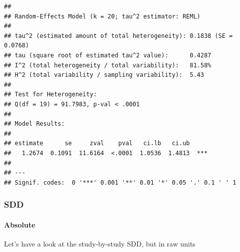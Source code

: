 \documentclass[
]{article}
\begin{document}
\begin{verbatim}
## 
## Random-Effects Model (k = 20; tau^2 estimator: REML)
## 
## tau^2 (estimated amount of total heterogeneity): 0.1838 (SE = 0.0768)
## tau (square root of estimated tau^2 value):      0.4287
## I^2 (total heterogeneity / total variability):   81.58%
## H^2 (total variability / sampling variability):  5.43
## 
## Test for Heterogeneity:
## Q(df = 19) = 91.7983, p-val < .0001
## 
## Model Results:
## 
## estimate      se     zval    pval   ci.lb   ci.ub 
##   1.2674  0.1091  11.6164  <.0001  1.0536  1.4813  *** 
## 
## ---
## Signif. codes:  0 '***' 0.001 '**' 0.01 '*' 0.05 '.' 0.1 ' ' 1
\end{verbatim}

\hypertarget{sdd}{%
\subsubsection{SDD}\label{sdd}}

\hypertarget{absolute}{%
\paragraph{Absolute}\label{absolute}}

Let's have a look at the study-by-study SDD, but in raw units
\end{document}
